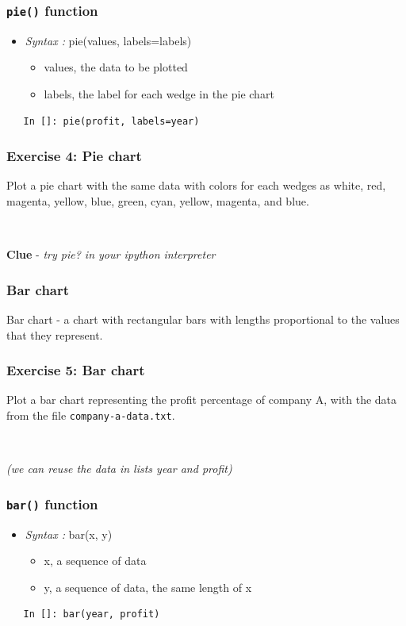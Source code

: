 \documentclass[presentation]{beamer}
\begin{document}
\begin{frame}[fragile]
\frametitle{\verb~pie()~ function}
\label{sec-10}


\begin{itemize}
\item \emph{Syntax :} pie(values, labels=labels)
\begin{itemize}
\item values, the data to be plotted
\item labels, the label for each wedge in the pie chart
\end{itemize}
\end{itemize}
\begin{verbatim}
   In []: pie(profit, labels=year)
\end{verbatim}
\end{frame}
\begin{frame}[fragile]
\frametitle{Exercise 4: Pie chart}
\label{sec-11}

  Plot a pie chart with the same data with colors for each wedges as white, red, 
  magenta, yellow, blue, green, cyan, yellow, magenta, and blue.
\begin{verbatim}
   
\end{verbatim}

  \textbf{Clue} - \emph{try pie? in your ipython interpreter}
\end{frame}
\begin{frame}
\frametitle{Bar chart}
\label{sec-12}

  Bar chart - a chart with rectangular bars with lengths proportional 
  to the values that they represent.
\end{frame}
\begin{frame}[fragile]
\frametitle{Exercise 5: Bar chart}
\label{sec-13}

  Plot a bar chart representing the profit percentage of company A, with the data 
  from the file \verb~company-a-data.txt~.
\begin{verbatim}
   
\end{verbatim}

  \emph{(we can reuse the data in lists year and profit)}
\end{frame}
\begin{frame}[fragile]
\frametitle{\verb~bar()~ function}
\label{sec-14}


\begin{itemize}
\item \emph{Syntax :} bar(x, y)
\begin{itemize}
\item x, a sequence of data
\item y, a sequence of data, the same length of x
\end{itemize}
\end{itemize}
\begin{verbatim}
   In []: bar(year, profit)
\end{verbatim}
\end{frame}
\end{document}
